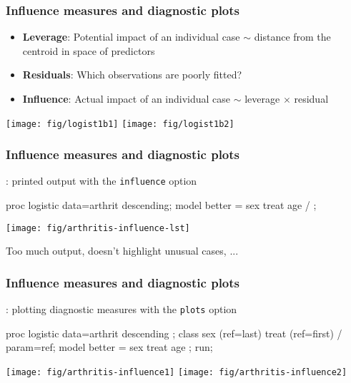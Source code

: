 \renewcommand{\FileName}{loginfl1}
\begin{frame}
  \frametitle{Influence measures and diagnostic plots}
  \begin{itemize}
	\item{\large\bfseries Leverage}: Potential impact of an individual case $\sim$ distance
	from the centroid in space of predictors
	\item{\large\bfseries Residuals}: Which observations are poorly fitted? 
	\item{\large\bfseries Influence}: Actual impact of an individual case $\sim$ leverage $\times$ residual
  \end{itemize}
 \begin{center}
  \texttt{[image: fig/logist1b1]}
  \texttt{[image: fig/logist1b2]}
 \end{center}
\end{frame}

\begin{frame}[fragile]
  \frametitle{Influence measures and diagnostic plots}
: printed output with the \alert{\texttt{influence}} option
\begin{Input}
proc logistic data=arthrit descending;
   model better = sex treat age / ;
\end{Input}

 \begin{center}
\texttt{[image: fig/arthritis-influence-lst]}
 \end{center}
Too much output, doesn't highlight unusual cases, ...
\end{frame}

\begin{frame}[fragile]
  \frametitle{Influence measures and diagnostic plots}
: plotting diagnostic measures with the \alert{\texttt{plots}} option
\begin{Input}
proc logistic data=arthrit descending 
         ;
   class sex (ref=last) treat (ref=first) / param=ref;
   model  better = sex treat age ;
	run;
\end{Input}

 \begin{center}
\texttt{[image: fig/arthritis-influence1]}
\texttt{[image: fig/arthritis-influence2]}
 \end{center}
\end{frame}


